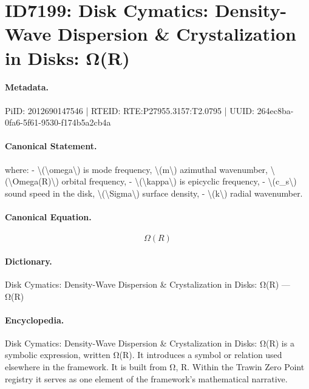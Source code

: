 \section*{ID7199: Disk Cymatics: Density-Wave Dispersion \& Crystalization in Disks: Ω(R)}
\paragraph{Metadata.}
PiID: 2012690147546 | RTEID: RTE:P27955.3157:T2.0795 | UUID: 264ec8ba-0fa6-5f61-9530-f174b5a2cb4a

\paragraph{Canonical Statement.}
where: - \textbackslash{}(\textbackslash{}omega\textbackslash{}) is mode frequency, \textbackslash{}(m\textbackslash{}) azimuthal wavenumber, \textbackslash{}(\textbackslash{}Omega(R)\textbackslash{}) orbital frequency, - \textbackslash{}(\textbackslash{}kappa\textbackslash{}) is epicyclic frequency, - \textbackslash{}(c\_s\textbackslash{}) sound speed in the disk, \textbackslash{}(\textbackslash{}Sigma\textbackslash{}) surface density, - \textbackslash{}(k\textbackslash{}) radial wavenumber.

\paragraph{Canonical Equation.}
\[
\Omega(R)
\]

\paragraph{Dictionary.}
Disk Cymatics: Density-Wave Dispersion \& Crystalization in Disks: Ω(R) — Ω(R)

\paragraph{Encyclopedia.}
Disk Cymatics: Density-Wave Dispersion \& Crystalization in Disks: Ω(R) is a symbolic expression, written Ω(R). It introduces a symbol or relation used elsewhere in the framework. It is built from Ω, R. Within the Trawin Zero Point registry it serves as one element of the framework's mathematical narrative.
